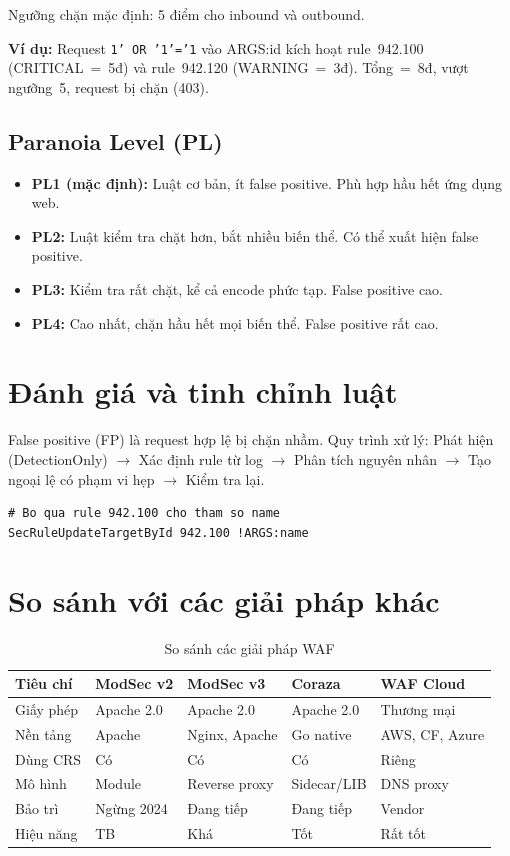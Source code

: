 \documentclass[12pt,a4paper,twoside]{report}
\begin{document}
Ngưỡng chặn mặc định: 5 điểm cho inbound và outbound.

\textbf{Ví dụ:} Request \texttt{1' OR '1'='1} vào ARGS:id kích hoạt rule~942.100 (CRITICAL~=~5đ) và rule~942.120 (WARNING~=~3đ). Tổng~=~8đ, vượt ngưỡng~5, request bị chặn (403).

\subsection{Paranoia Level (PL)}

\begin{itemize}
    \item \textbf{PL1 (mặc định):} Luật cơ bản, ít false positive. Phù hợp hầu hết ứng dụng web.
    \item \textbf{PL2:} Luật kiểm tra chặt hơn, bắt nhiều biến thể. Có thể xuất hiện false positive.
    \item \textbf{PL3:} Kiểm tra rất chặt, kể cả encode phức tạp. False positive cao.
    \item \textbf{PL4:} Cao nhất, chặn hầu hết mọi biến thể. False positive rất cao.
\end{itemize}

\section{Đánh giá và tinh chỉnh luật}

False positive (FP) là request hợp lệ bị chặn nhầm. Quy trình xử lý: Phát hiện (DetectionOnly) $\rightarrow$ Xác định rule từ log $\rightarrow$ Phân tích nguyên nhân $\rightarrow$ Tạo ngoại lệ có phạm vi hẹp $\rightarrow$ Kiểm tra lại.

\begin{lstlisting}[caption=Ngoại lệ cho false positive]
# Bo qua rule 942.100 cho tham so name
SecRuleUpdateTargetById 942.100 !ARGS:name
\end{lstlisting}

\section{So sánh với các giải pháp khác}

\begin{table}[H]
\centering
\caption{So sánh các giải pháp WAF}
\label{tab:waf_compare}
\begin{tabular}{L{2.2cm}C{2cm}C{2cm}C{2cm}C{2.5cm}}
\toprule
\textbf{Tiêu chí} & \textbf{ModSec v2} & \textbf{ModSec v3} & \textbf{Coraza} & \textbf{WAF Cloud} \\
\midrule
Giấy phép & Apache 2.0 & Apache 2.0 & Apache 2.0 & Thương mại \\
Nền tảng & Apache & Nginx, Apache & Go native & AWS, CF, Azure \\
Dùng CRS & Có & Có & Có & Riêng \\
Mô hình & Module & Reverse proxy & Sidecar/LIB & DNS proxy \\
Bảo trì & Ngừng 2024 & Đang tiếp & Đang tiếp & Vendor \\
Hiệu năng & TB & Khá & Tốt & Rất tốt \\
\bottomrule
\end{tabular}
\end{table}
\end{document}

